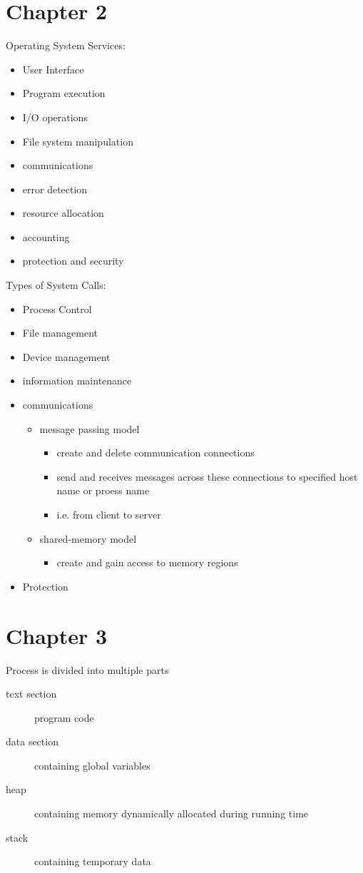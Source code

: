 \documentclass[11pt]{article}
\begin{document}
\section{Chapter 2}
\label{sec:orgdf5cb59}
Operating System Services:
\begin{itemize}
\item User Interface
\item Program execution
\item I/O operations
\item File system manipulation
\item communications
\item error detection
\item resource allocation
\item accounting
\item protection and security
\end{itemize}
Types of System Calls:
\begin{itemize}
\item Process Control
\item File management
\item Device management
\item information maintenance
\item communications
\begin{itemize}
\item message passing model
\begin{itemize}
\item create and delete communication connections
\item send and receives messages across these connections to specified host name or proess name
\item i.e. from client to server
\end{itemize}
\item shared-memory model
\begin{itemize}
\item create and gain access to memory regions
\end{itemize}
\end{itemize}
\item Protection
\end{itemize}
\section{Chapter 3}
\label{sec:orgc3e65e9}
Process is divided into multiple parts
\begin{description}
\item[{text section}] program code
\item[{data section}] containing global variables
\item[{heap}] containing memory dynamically allocated during running time
\item[{stack}] containing temporary data
\end{description}
\end{document}
